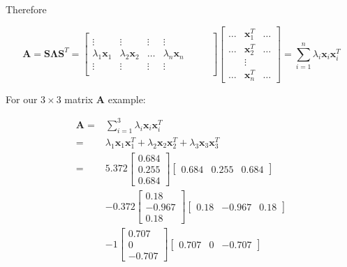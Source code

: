 \documentclass[main.tex]{subfiles}
\begin{document}
Therefore

$$
\mathbf{A}=\mathbf{S} \mathbf{\Lambda} \mathbf{S}^{T}=\left[\begin{array}{cccc} 
& & & \\
\vdots & \vdots & \vdots & \vdots \\
\lambda_{1} \mathbf{x}_{1} & \lambda_{2} \mathbf{x}_{2} & \ldots & \lambda_{n} \mathbf{x}_{n} \\
\vdots & \vdots & \vdots & \vdots
& & & \\
\end{array}\right]
\left[\begin{array}{ccc}
\ldots & \mathbf{x}_{1}^{T} & \ldots \\
\ldots & \mathbf{x}_{2}^{T} & \ldots \\
& \vdots & \\
\ldots & \mathbf{x}_{n}^{T} & \ldots
\end{array}\right]=\sum_{i=1}^{n} \lambda_{i} \mathbf{x}_{i} \mathbf{x}_{i}^{T}
$$

For our $3 \times 3$ matrix $\mathbf{A}$ example:

$$
\begin{aligned}
\mathbf{A}=& \sum_{i=1}^{3} \lambda_{i} \mathbf{x}_{i} \mathbf{x}_{i}^{T} \\
=& \lambda_{1} \mathbf{x}_{1} \mathbf{x}_{1}^{T}+\lambda_{2} \mathbf{x}_{2} \mathbf{x}_{2}^{T}+\lambda_{3} \mathbf{x}_{3} \mathbf{x}_{3}^{T} \\
=& 5.372\left[\begin{array}{c}
0.684 \\
0.255 \\
0.684
\end{array}\right]\left[\begin{array}{llll}
0.684 & 0.255 & 0.684
\end{array}\right] \\
&-0.372\left[\begin{array}{c}
0.18 \\
-0.967 \\
0.18
\end{array}\right]\left[\begin{array}{llll}
0.18 & -0.967 & 0.18
\end{array}\right] \\
&-1\left[\begin{array}{c}
0.707 \\
0 \\
-0.707
\end{array}\right]\left[\begin{array}{lll}
0.707 & 0 & -0.707
\end{array}\right]
\end{aligned}
$$
\end{document}
